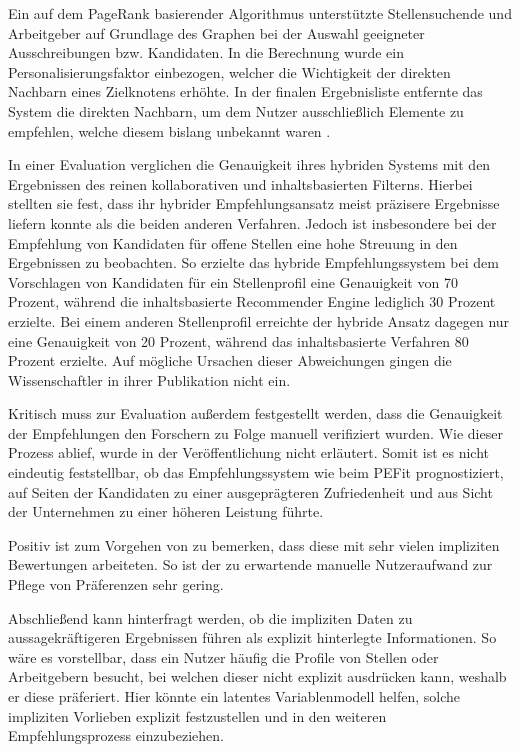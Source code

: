 Ein auf dem PageRank basierender Algorithmus unterstützte Stellensuchende und Arbeitgeber auf Grundlage des Graphen bei der Auswahl geeigneter Ausschreibungen bzw. Kandidaten. In die Berechnung wurde ein Personalisierungsfaktor einbezogen, welcher die Wichtigkeit der direkten Nachbarn eines Zielknotens erhöhte. In der finalen Ergebnisliste entfernte das System die direkten Nachbarn, um dem Nutzer ausschließlich Elemente zu empfehlen, welche diesem bislang unbekannt waren \cite[S. 3]{lu:2013}.

In einer Evaluation verglichen \textcite[S. 3f.]{lu:2013} die Genauigkeit ihres hybriden Systems mit den Ergebnissen des reinen kollaborativen und inhaltsbasierten Filterns. Hierbei stellten sie fest, dass ihr hybrider Empfehlungsansatz meist präzisere Ergebnisse liefern konnte als die beiden anderen Verfahren. Jedoch ist insbesondere bei der Empfehlung von Kandidaten für offene Stellen eine hohe Streuung in den Ergebnissen zu beobachten. So erzielte das hybride Empfehlungssystem bei dem Vorschlagen von Kandidaten für ein Stellenprofil eine Genauigkeit von 70 Prozent, während die inhaltsbasierte Recommender Engine lediglich 30 Prozent erzielte. Bei einem anderen Stellenprofil erreichte der hybride Ansatz dagegen nur eine Genauigkeit von 20 Prozent, während das inhaltsbasierte Verfahren 80 Prozent erzielte. Auf mögliche Ursachen dieser Abweichungen gingen die Wissenschaftler in ihrer Publikation nicht ein.

Kritisch muss zur Evaluation außerdem festgestellt werden, dass die Genauigkeit der Empfehlungen den Forschern zu Folge manuell verifiziert wurden. Wie dieser Prozess ablief, wurde in der Veröffentlichung nicht erläutert. Somit ist es nicht eindeutig feststellbar, ob das Empfehlungssystem wie beim \ac{PEFit} prognostiziert, auf Seiten der Kandidaten zu einer ausgeprägteren Zufriedenheit und aus Sicht der Unternehmen zu einer höheren Leistung führte.

Positiv ist zum Vorgehen von \textcite[S. 1ff.]{lu:2013} zu bemerken, dass diese mit sehr vielen impliziten Bewertungen arbeiteten. So ist der zu erwartende manuelle Nutzeraufwand zur Pflege von Präferenzen sehr gering.

Abschließend kann hinterfragt werden, ob die impliziten Daten zu aussagekräftigeren Ergebnissen führen als explizit hinterlegte Informationen. So wäre es vorstellbar, dass ein Nutzer häufig die Profile von Stellen oder Arbeitgebern besucht, bei welchen dieser nicht explizit ausdrücken kann, weshalb er diese präferiert. Hier könnte ein latentes Variablenmodell helfen, solche impliziten Vorlieben explizit festzustellen und in den weiteren Empfehlungsprozess einzubeziehen.
